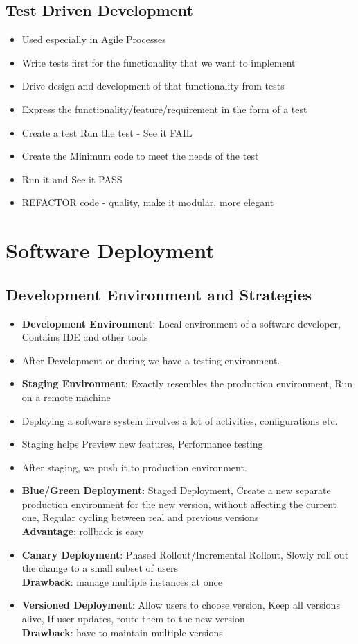 \documentclass[a4paper]{article}
\begin{document}
\subsection{Test Driven Development}
\begin{itemize}
    \item Used especially in Agile Processes
    \item Write tests first for the functionality that we want to implement
    \item Drive design and development of that functionality from tests
    \item Express the functionality/feature/requirement in the form of a test
    \item Create a test Run the test - See it FAIL
    \item Create the Minimum code to meet the needs of the test
    \item Run it and See it PASS
    \item REFACTOR code - quality, make it modular, more elegant
\end{itemize}

\section{Software Deployment}
\subsection{Development Environment and Strategies}
\begin{itemize}
    \item \textbf{Development Environment}: Local environment of a software developer, Contains IDE and other tools
    \item After Development or during we have a testing environment.
    \item \textbf{Staging Environment}: Exactly resembles the production environment, Run on a remote machine
    \item Deploying a software system involves a lot of activities, configurations etc.
    \item Staging helps Preview new features, Performance testing
    \item After staging, we push it to production environment.
    \item \textbf{Blue/Green Deployment}: Staged Deployment, Create a new separate production environment for the new version, without affecting the current one, Regular cycling between real and previous versions\\
    \textbf{Advantage}: rollback is easy
    \item \textbf{Canary Deployment}: Phased Rollout/Incremental Rollout, Slowly roll out the change to a small subset of users\\
    \textbf{Drawback}: manage multiple instances at once
    \item \textbf{Versioned Deployment}: Allow users to choose version, Keep all versions alive, If user updates, route them to the new version\\
    \textbf{Drawback}: have to maintain multiple versions
\end{itemize}
\end{document}
